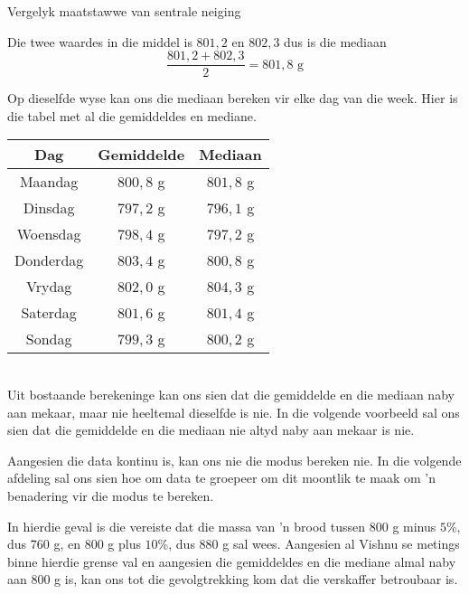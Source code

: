 \begin{wex}{
Vergelyk maatstawwe van sentrale neiging
}
{  Die twee waardes in die middel is $801,2$ en $802,3$ dus is die mediaan
  \begin{equation*}
    \frac{801,2 + 802,3}{2} = 801,8\mbox{ g}
  \end{equation*}

  Op dieselfde wyse kan ons die mediaan bereken vir elke dag van die week. Hier is die tabel met al die gemiddeldes en mediane. 
\\
  \begin{center}
    \begin{tabular}{|c|c|c|} \hline
      \textbf{Dag} & \textbf{Gemiddelde} &\textbf{Mediaan} \\  \hline
      Maandag & $800,8$ g & $801,8$ g \\ \hline
      Dinsdag & $797,2$ g & $796,1$ g \\ \hline
      Woensdag & $798,4$ g & $797,2$ g \\ \hline
      Donderdag & $803,4$ g & $800,8$ g \\ \hline
      Vrydag & $802,0$ g & $804,3$ g \\ \hline
      Saterdag & $801,6$ g & $801,4$ g \\ \hline
      Sondag & $799,3$ g & $800,2$ g \\ \hline
    \end{tabular}
  \end{center}
\vspace{8pt}\\
  Uit bostaande berekeninge kan ons sien dat die gemiddelde en die mediaan naby aan mekaar, maar nie heeltemal dieselfde  is nie. In die volgende voorbeeld sal ons sien dat die gemiddelde en die mediaan nie altyd naby aan mekaar is nie.


  Aangesien die data kontinu is, kan ons nie die modus bereken nie. In die volgende afdeling sal ons sien hoe om data te groepeer om dit moontlik te maak om ’n benadering vir die modus te bereken.


  In hierdie geval is die vereiste dat die massa van ’n brood tussen $800$ g minus $5$\%, dus $760$ g, en $800$ g plus 
  $10$\%, dus $880$ g sal wees. Aangesien al Vishnu se metings binne hierdie grense val en aangesien die gemiddeldes en die mediane almal naby aan $800$ g is, kan ons tot die gevolgtrekking kom dat die verskaffer betroubaar is.
}
\end{wex}

